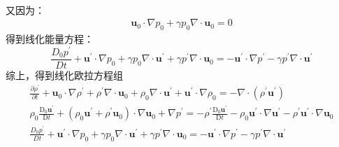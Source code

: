 \begin{enumerate}
\begin{equation}
\begin{aligned}
            \end{aligned}
        \end{equation}
        又因为：
        \begin{gather}
            \mathbf{u}_{0} \cdot \nabla p_{0}+\gamma p_{0} \nabla \cdot \mathbf{u}_{0}=0
        \end{gather}
        得到线化能量方程：
        \begin{equation}
            \frac{D_{0} p^{\prime}}{D t}+\mathbf{u}^{\prime} \cdot \nabla p_{0}+\gamma p_{0} \nabla \cdot \mathbf{u}^{\prime}+\gamma p^{\prime} \nabla \cdot \mathbf{u}_{0}
            =-\mathbf{u}^{\prime} \cdot \nabla p^{\prime}-\gamma p^{\prime} \nabla \cdot \mathbf{u}^{\prime}
        \end{equation}
        综上，得到线化欧拉方程组
        \begin{equation}
            \begin{gathered}
                \frac{\partial \rho^{\prime}}{\partial t}+\mathbf{u}_{0} \cdot \nabla \rho^{\prime}+\rho^{\prime} \nabla \cdot \mathbf{u}_{0}+\rho_{0} \nabla \cdot \mathbf{u}^{\prime}+\mathbf{u}^{\prime} \cdot \nabla \rho_{0}
                = -\nabla \cdot\left(\rho^{\prime} \mathbf{u}^{\prime}\right) 
                \\
                \rho_{0} \frac{\mathrm{D}_{0} \mathbf{u}^{\prime}}{\mathrm{D} t}+\left(\rho_{0} \mathbf{u}^{\prime}+\rho^{\prime} \mathbf{u}_{0}\right) \cdot \nabla \mathbf{u}_{0}+\nabla p^{\prime}
                =-\rho^{\prime} \frac{\mathrm{D}_{0} \mathbf{u}^{\prime}}{\mathrm{D} t}-\rho_{0} \mathbf{u}^{\prime} \cdot \nabla \mathbf{u}^{\prime}-\rho^{\prime} \mathbf{u}^{\prime} \cdot \nabla \mathbf{u}_{0}
                \\
                \frac{D_{0} p^{\prime}}{D t}+\mathbf{u}^{\prime} \cdot \nabla p_{0}+\gamma p_{0} \nabla \cdot \mathbf{u}^{\prime}+\gamma p^{\prime} \nabla \cdot \mathbf{u}_{0}
                =-\mathbf{u}^{\prime} \cdot \nabla p^{\prime}-\gamma p^{\prime} \nabla \cdot \mathbf{u}^{\prime}    
            \end{gathered}
        \end{equation}
\end{enumerate}